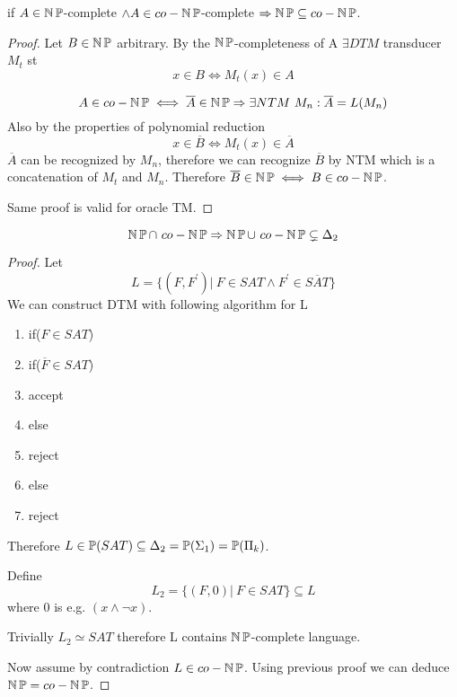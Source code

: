 \begin{theorem}[NP = co-NP]
	if $A \in \TNP$-complete $\land A \in co-\TNP$-complete $\Rightarrow \TNP \subseteq co-\TNP$.
\end{theorem}
\begin{proof}
	Let $B \in \TNP$ arbitrary.
	By the $\TNP$-completeness of A $\exists DTM$ transducer $M_t$ st
	\[ x \in B \iff M_t(x) \in A \]

	\[ A \in co-\TNP \iff \overline{A} \in \TNP \Rightarrow \exists NTM\ M_n: \overline{A} = L(M_n) \]
	Also by the properties of polynomial reduction
	\[ x \in \overline{B} \iff M_t(x) \in \overline{A} \]
	$\overline{A}$ can be recognized by $M_n$, therefore we can recognize $\overline{B}$ by NTM which is a concatenation of $M_t$ and $M_n$.
	Therefore $\overline{B} \in \TNP \iff B \in co-\TNP $.

	Same proof is valid for oracle TM.
\end{proof}

\begin{theorem}[NP $\neq$ co-NP]
	\[ \TNP \cap\ co-\TNP \Rightarrow \TNP \cup\ co-\TNP \subsetneq \Delta_2 \]
\end{theorem}
\begin{proof}
	Let
	\[ L = \{ (F, F^{\prime}) |\ F \in SAT \land F^{\prime} \in \overline{SAT} \} \]
	We can construct DTM with following algorithm for L

	\begin{enumerate}
		\item if($F \in SAT$)
		\item \tab if($\overline{F} \in SAT$)
		\item \tab \tab accept
		\item \tab else
		\item \tab \tab reject
		\item else
		\item \tab reject
	\end{enumerate}

	Therefore $L \in \TP(SAT) \subseteq \Delta_2 = \TP(\Sigma_1) = \TP(\Pi_k)$.

	Define
	\[ L_2 = \{ (F, 0)|\ F \in SAT \} \subseteq L \]
	where $0$ is e.g. $(x \land \neg x)$.

	Trivially $ L_2 \simeq SAT$ therefore L contains $\TNP$-complete language.

	Now assume by contradiction $L \in co-\TNP$.
	Using previous proof we can deduce $\TNP = co-\TNP$.
\end{proof}

